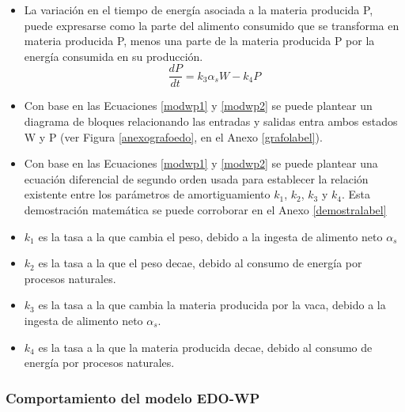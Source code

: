 \begin{itemize}
    \item La variación en el tiempo de energía asociada a la materia producida P, puede expresarse como 
    la parte del alimento consumido que se transforma en materia producida P, menos una parte de la materia producida P por la energía consumida en su producción.
    \begin{equation}\label{modwp2}
        \frac{dP}{dt} = k_{3}\alpha_{s}W - k_{4}P
    \end{equation}
    \item Con base en las Ecuaciones \ref{modwp1} y \ref{modwp2} se puede plantear un diagrama de bloques relacionando las entradas y salidas entra ambos estados W y P (ver Figura \ref{anexografoedo}, en el Anexo \ref{grafolabel}).
    \item Con base en las Ecuaciones \ref{modwp1} y \ref{modwp2} se puede plantear una ecuación diferencial de segundo orden usada para establecer la relación existente entre los parámetros de amortiguamiento $k_{1}$, $k_{2}$, $k_{3}$ y $k_{4}$. Esta demostración matemática se puede corroborar en el Anexo \ref{demostralabel}
    \item $k_{1}$ es la tasa a la que cambia el peso, debido a la ingesta de alimento neto $\alpha_{s}$
    \item $k_{2}$ es la tasa a la que el peso decae, debido al consumo de energía por procesos naturales.
    \item $k_{3}$ es la tasa a la que cambia la materia producida por la vaca, debido a la ingesta de alimento neto $\alpha_{s}$.
    \item $k_{4}$ es la tasa a la que la materia producida decae, debido al consumo de energía por procesos naturales.
    
\end{itemize}

\subsubsection{Comportamiento del modelo EDO-WP}

